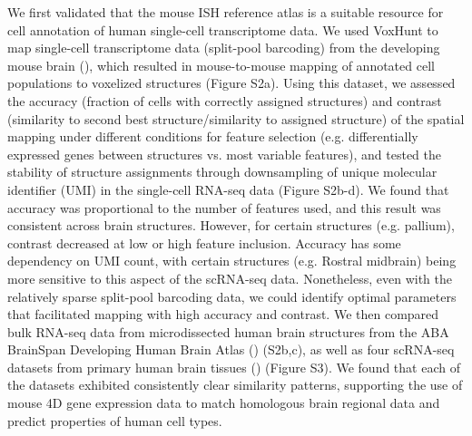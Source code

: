 We first validated that the mouse ISH reference atlas is a suitable resource for cell annotation of human single-cell transcriptome data. We used VoxHunt to map single-cell transcriptome data (split-pool barcoding) from the developing mouse brain (\cite{rosenberg_single-cell_2018}), which resulted in mouse-to-mouse mapping of annotated cell populations to voxelized structures (Figure S2a). Using this dataset, we assessed the accuracy (fraction of cells with correctly assigned structures) and contrast (similarity to second best structure/similarity to assigned structure) of the spatial mapping under different conditions for feature selection (e.g. differentially expressed genes between structures vs. most variable features), and tested the stability of structure assignments through downsampling of unique molecular identifier (UMI) in the single-cell RNA-seq data (Figure S2b-d). We found that accuracy was proportional to the number of features used, and this result was consistent across brain structures. However, for certain structures (e.g. pallium), contrast decreased at low or high feature inclusion. Accuracy has some dependency on UMI count, with certain structures (e.g. Rostral midbrain) being more sensitive to this aspect of the scRNA-seq data. Nonetheless, even with the relatively sparse split-pool barcoding data, we could identify optimal parameters that facilitated mapping with high accuracy and contrast. We then compared bulk RNA-seq data from microdissected human brain structures from the ABA BrainSpan Developing Human Brain Atlas (\cite{thompson_high-resolution_2014}) (S2b,c), as well as four scRNA-seq datasets from primary human brain tissues (\cite{fan_spatial_2018,nowakowski_spatiotemporal_2017,polioudakis_single-cell_2019,zhong_single-cell_2018}) (Figure S3). We found that each of the datasets exhibited consistently clear similarity patterns, supporting the use of mouse 4D gene expression data to match homologous brain regional data and predict properties of human cell types.



